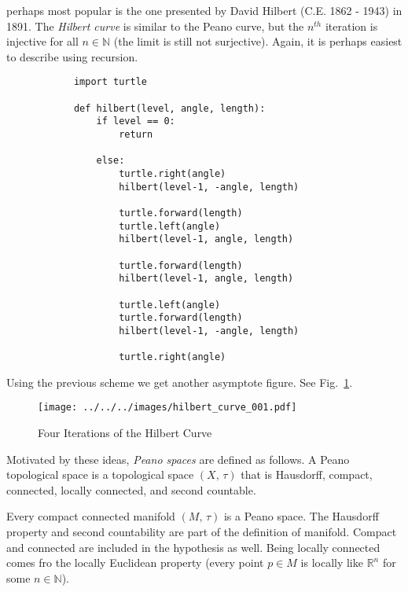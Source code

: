 \documentclass{article}
\theoremstyle{plain}
\theoremstyle{normal}
\newenvironment{example}{%
    \pushQED{\qed}\renewcommand{\qedsymbol}{$\blacksquare$}\examplex%
}{%
    \popQED\endexamplex%
}
\newenvironment{definition}{%
    \pushQED{\qed}\renewcommand{\qedsymbol}{$\blacksquare$}\definitionx%
}{%
    \popQED\enddefinitionx%
}
\begin{document}
        perhaps most popular is the one presented by
        David Hilbert (C.E. 1862 - 1943) in 1891. The
        \textit{Hilbert curve}
        is similar to the Peano curve, but the $n^{th}$ iteration is injective
        for all $n\in\mathbb{N}$ (the limit is still not surjective). Again,
        it is perhaps easiest to describe using recursion.
        \begin{verbatim}
            import turtle

            def hilbert(level, angle, length):
                if level == 0:
                    return

                else:
                    turtle.right(angle)
                    hilbert(level-1, -angle, length)
             
                    turtle.forward(length)
                    turtle.left(angle)
                    hilbert(level-1, angle, length)
             
                    turtle.forward(length)
                    hilbert(level-1, angle, length)

                    turtle.left(angle)
                    turtle.forward(length)
                    hilbert(level-1, -angle, length)

                    turtle.right(angle)
        \end{verbatim}
        Using the previous scheme we get another asymptote figure. See
        Fig.~\ref{fig:hilber_curve_001}.
        \begin{figure}
            \centering
            \texttt{[image: ../../../images/hilbert\_curve\_001.pdf]}
            \caption{Four Iterations of the Hilbert Curve}
            \label{fig:hilber_curve_001}
        \end{figure}
        Motivated by these ideas, \textit{Peano spaces}
        are defined as follows.
        \begin{definition}[Peano Space]
            A Peano topological space is a topological space $(X,\,\tau)$
            that is Hausdorff, compact, connected, locally connected, and
            second countable.
        \end{definition}
        \begin{example}
            Every compact connected manifold $(M,\,\tau)$ is a Peano space.
            The Hausdorff property and second countability are part of the
            definition of manifold. Compact and connected are included in the
            hypothesis as well. Being locally connected comes fro the locally
            Euclidean property (every point $p\in{M}$ is locally like
            $\mathbb{R}^{n}$ for some $n\in\mathbb{N}$).
        \end{example}
\end{document}

